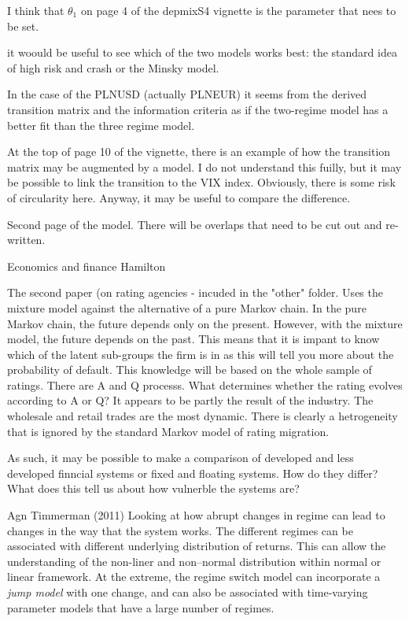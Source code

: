 \documentclass[12pt, a4paper, oneside]{article} %
\begin{document}
I think that $\theta_1$ on page 4 of the depmixS4 vignette is the parameter that nees to be set. 

it woould be useful to see which of the two models works best: the standard idea of high risk and crash or the Minsky model.  

In the case of the PLNUSD (actually PLNEUR) it seems from the derived transition matrix and the information criteria as if the two-regime model has a better fit than the three regime model. 

At the top of page 10 of the vignette, there is an example of how the transition matrix may be augmented by a model.  I do not understand this fuilly, but it may be possible to link the transition to the VIX index.  Obviously, there is some risk of circularity here. Anyway, it may be useful to compare the difference. 

Second page of the model.  There will be overlaps that need to be cut out and re-written. 




Economics and finance
Hamilton

The second paper (on rating agencies - incuded in the "other" folder.  Uses the mixture model against the alternative of a pure Markov chain. In the pure Markov chain, the future depends only on the present.  However, with the mixture model, the future depends on the past.  This means that it is impant to know which of the latent sub-groups the firm is in as this will tell you more about the probability of default.  This knowledge will be based on the whole sample of ratings. There are A and Q processs.  What determines whether the rating evolves according to A or Q?  It appears to be partly the result of the industry.  The wholesale and retail trades are the most dynamic. There is clearly a hetrogeneity that is ignored by the standard Markov model of rating migration. 

As such, it may be possible to make a comparison of developed and less developed finncial systems or fixed and floating systems.  How do they differ?  What does this tell us about how vulnerble the systems are?  


Agn Timmerman (2011)
Looking at how abrupt changes in regime can lead to changes in the way that the system works.  The different regimes can be associated with different underlying distribution of returns.  This can allow the understanding of the non-liner and non--normal distribution within  normal or linear framework.  At the extreme, the regime switch model can incorporate a \emph{jump model} with one change, and can also be associated with time-varying parameter models that have a large number of regimes.
\end{document}
